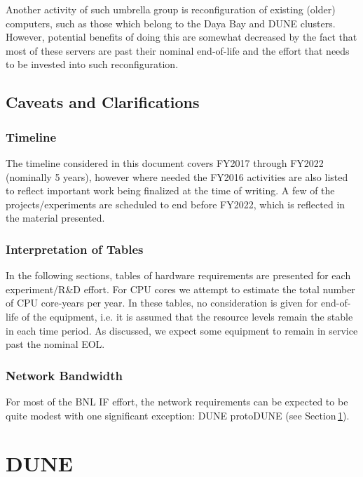 \documentclass[pdftex,12pt,letter]{article}
\begin{document}

Another activity of such umbrella group is reconfiguration of existing (older) computers,
such as those which belong to the Daya Bay and DUNE clusters. However, potential benefits of doing
this are somewhat decreased by the fact that most of these servers are past their nominal
end-of-life and the effort that needs to be invested into such reconfiguration.

\subsection{Caveats and Clarifications}

\subsubsection{Timeline}
The timeline considered in this document covers FY2017 through FY2022 (nominally 5 years), however where needed
the FY2016 activities are also listed to reflect important work being finalized at the time of writing.
A few of the projects/experiments are scheduled to end before FY2022, which is reflected in the material presented.

\subsubsection{Interpretation of Tables}

In the following sections, tables of hardware requirements are presented for each experiment/R\&D effort.
For CPU cores we attempt to estimate the total number of CPU core-years per year.
In these tables, no consideration is given for end-of-life of the equipment, i.e. it is assumed that
the resource levels remain the stable in each time period. As discussed, we expect some equipment to remain
in service past the nominal EOL.

\subsubsection{Network Bandwidth}
For most of the BNL IF effort, the network requirements can be expected to be quite modest with one
significant exception: DUNE protoDUNE (see Section\,\ref{sec:dune}).


\pagebreak
\section{DUNE}
\label{sec:dune}
\end{document}
